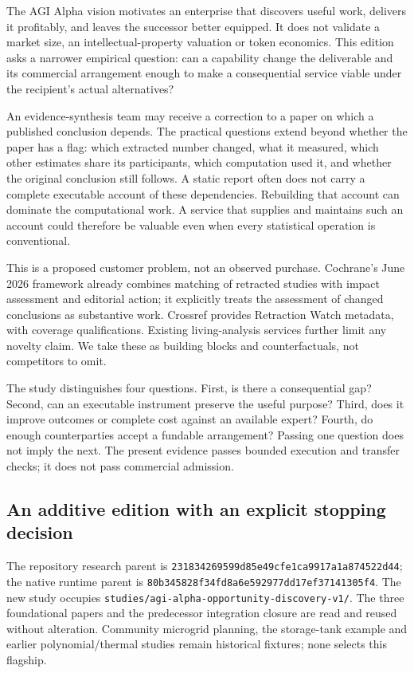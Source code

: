 \documentclass[11pt]{article}
\begin{document}
The AGI Alpha vision motivates an enterprise that discovers useful work, delivers it profitably, and leaves the successor better equipped. It does not validate a market size, an intellectual-property valuation or token economics. This edition asks a narrower empirical question: can a capability change the deliverable and its commercial arrangement enough to make a consequential service viable under the recipient's actual alternatives?

An evidence-synthesis team may receive a correction to a paper on which a published conclusion depends. The practical questions extend beyond whether the paper has a flag: which extracted number changed, what it measured, which other estimates share its participants, which computation used it, and whether the original conclusion still follows. A static report often does not carry a complete executable account of these dependencies. Rebuilding that account can dominate the computational work. A service that supplies and maintains such an account could therefore be valuable even when every statistical operation is conventional.

This is a proposed customer problem, not an observed purchase. Cochrane's June 2026 framework already combines matching of retracted studies with impact assessment and editorial action; it explicitly treats the assessment of changed conclusions as substantive work. Crossref provides Retraction Watch metadata, with coverage qualifications. Existing living-analysis services further limit any novelty claim. We take these as building blocks and counterfactuals, not competitors to omit.\citep{cochrane,crossref,dynameta}

The study distinguishes four questions. First, is there a consequential gap? Second, can an executable instrument preserve the useful purpose? Third, does it improve outcomes or complete cost against an available expert? Fourth, do enough counterparties accept a fundable arrangement? Passing one question does not imply the next. The present evidence passes bounded execution and transfer checks; it does not pass commercial admission.

\subsection{An additive edition with an explicit stopping decision}

The repository research parent is \nolinkurl{231834269599d85e49cfe1ca9917a1a874522d44}; the native runtime parent is \nolinkurl{80b345828f34fd8a6e592977dd17ef37141305f4}. The new study occupies \texttt{studies/agi-alpha-opportunity-discovery-v1/}. The three foundational papers and the predecessor integration closure are read and reused without alteration. Community microgrid planning, the storage-tank example and earlier polynomial/thermal studies remain historical fixtures; none selects this flagship.\citep{repository,ti,economy,harness}
\end{document}
